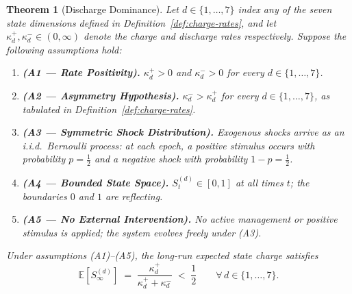 \documentclass[12pt,openany]{book}
\numberwithin{equation}{chapter}
\theoremstyle{plain}
\newtheorem{theorem}{Theorem}[chapter]
\theoremstyle{definition}
\theoremstyle{remark}
\def\mathcal#1{#1}%
\begin{document}
\begin{theorem}[Discharge Dominance]
\label{thm:discharge-dominance}
Let $d \in \{1,\ldots,7\}$ index any of the seven state
dimensions defined in Definition~\ref{def:charge-rates}, and
let $\kappa_d^{+}, \kappa_d^{-} \in (0,\infty)$ denote the
charge and discharge rates respectively.  Suppose the
following assumptions hold:

\begin{enumerate}
  \item \textbf{(A1 --- Rate Positivity).}
        $\kappa_d^{+} > 0$ and $\kappa_d^{-} > 0$ for every
        $d \in \{1,\ldots,7\}$.
  \item \textbf{(A2 --- Asymmetry Hypothesis).}
        $\kappa_d^{-} > \kappa_d^{+}$ for every
        $d \in \{1,\ldots,7\}$, as tabulated in
        Definition~\ref{def:charge-rates}.
  \item \textbf{(A3 --- Symmetric Shock Distribution).}
        Exogenous shocks arrive as an i.i.d.\ Bernoulli
        process: at each epoch, a positive stimulus occurs
        with probability $p = \tfrac{1}{2}$ and a negative
        shock with probability $1 - p = \tfrac{1}{2}$.
  \item \textbf{(A4 --- Bounded State Space).}
        $\mathcal{S}_t^{(d)} \in [0,1]$ at all times $t$;
        the boundaries $0$ and $1$ are reflecting.
  \item \textbf{(A5 --- No External Intervention).}
        No active management or positive stimulus is applied;
        the system evolves freely under (A3).
\end{enumerate}

Under assumptions \emph{(A1)--(A5)}, the long-run expected
state charge satisfies
\begin{equation}
  \mathbb{E}\!\left[\mathcal{S}_\infty^{(d)}\right]
  \;=\;
  \frac{\kappa_d^{+}}{\kappa_d^{+} + \kappa_d^{-}}
  \;<\; \frac{1}{2}
  \qquad \forall\, d \in \{1,\ldots,7\}.
  \label{eq:discharge-dominance}
\end{equation}
\end{theorem}
\end{document}
